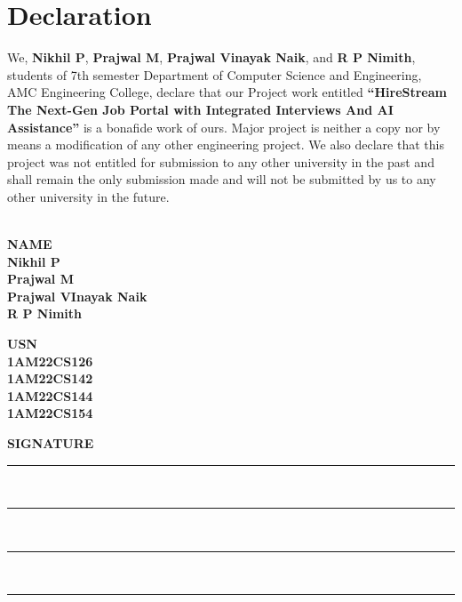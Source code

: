 \documentclass[a4paper, 12pt]{report}
\begin{document}
\chapter*{Declaration}
\thispagestyle{borderedpage}
We, \textbf{Nikhil P}, \textbf{Prajwal M}, \textbf{Prajwal Vinayak Naik}, and \textbf{R P Nimith}, students of 7th semester Department of Computer Science and Engineering, AMC Engineering College, declare that our Project work entitled \textbf{“HireStream The Next-Gen Job Portal with Integrated Interviews And AI Assistance” }is a bonafide work of ours. Major project is neither a copy nor by means a modification of any other engineering project. We also declare that this project was not entitled for submission to any other university in the past and shall remain the only submission made and will not be submitted by us to any other university in the future.\\
\vspace{1cm}\\
\noindent
\begin{minipage}[t]{0.32\textwidth}
    \centering
    \textbf{NAME\\[0.2cm]Nikhil P\\[0.2cm]Prajwal M\\[0.2cm]Prajwal VInayak Naik\\[0.2cm]R P Nimith}
\end{minipage}
\hfill
\begin{minipage}[t]{0.32\textwidth}
    \centering
    \textbf{USN\\[0.2cm]1AM22CS126\\[0.2cm]1AM22CS142\\[0.2cm]1AM22CS144\\[0.2cm]1AM22CS154}
\end{minipage}
\hfill
\begin{minipage}[t]{0.32\textwidth}
    \centering
    \textbf{SIGNATURE\\}
    \vspace{0.4cm}
    \rule{0.8\linewidth}{0.4pt}\\[0.2cm]
    \rule{0.8\linewidth}{0.4pt}\\[0.2cm]
    \rule{0.8\linewidth}{0.4pt}\\[0.2cm]
    \rule{0.8\linewidth}{0.4pt}\\[0.2cm]
\end{minipage}\\
\end{document}
